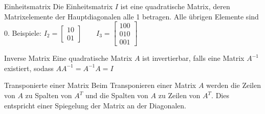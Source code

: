 \begin{definition}{Einheitsmatrix}
    Die Einheitsmatrix $I$ ist eine quadratische Matrix, deren Matrixelemente der Hauptdiagonalen alle 1 betragen.
    Alle übrigen Elemente sind 0.
    Beispiele: $I_2 = \begin{bmatrix}
                           1 0 \\
                           0 1
    \end{bmatrix} \quad \quad I_3 = \begin{bmatrix}
                                        1 0 0 \\
                                        0 1 0 \\
                                        0 0 1
    \end{bmatrix}$
\end{definition}

\begin{definition}{Inverse Matrix}
    Eine quadratische Matrix $A$ ist invertierbar, falls eine Matrix $A^{-1}$ existiert, sodass $AA^{-1} = A^{-1}A = I$
\end{definition}

\begin{definition}{Transponierte einer Matrix}
    Beim Transponieren einer Matrix $A$ werden die Zeilen von $A$ zu Spalten von $A^T$ und die Spalten von $A$ zu Zeilen von $A^T$.
    Dies entspricht einer Spiegelung der Matrix an der Diagonalen.
\end{definition}